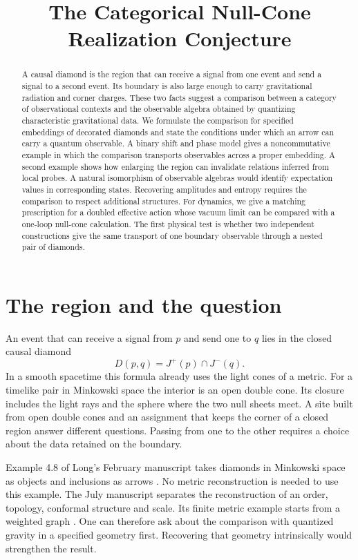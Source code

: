 \documentclass[11pt,letterpaper]{article}
\title{The Categorical Null-Cone Realization Conjecture\series{Synthesis}}
\begin{document}
\ifdefined\HCode\else{}\fi
\maketitle
\begin{abstract}
A causal diamond is the region that can receive a signal from one event and send a signal to a second event. Its boundary is also large enough to carry gravitational radiation and corner charges. These two facts suggest a comparison between a category of observational contexts and the observable algebra obtained by quantizing characteristic gravitational data. We formulate the comparison for specified embeddings of decorated diamonds and state the conditions under which an arrow can carry a quantum observable. A binary shift and phase model gives a noncommutative example in which the comparison transports observables across a proper embedding. A second example shows how enlarging the region can invalidate relations inferred from local probes. A natural isomorphism of observable algebras would identify expectation values in corresponding states. Recovering amplitudes and entropy requires the comparison to respect additional structures. For dynamics, we give a matching prescription for a doubled effective action whose vacuum limit can be compared with a one-loop null-cone calculation. The first physical test is whether two independent constructions give the same transport of one boundary observable through a nested pair of diamonds.
\end{abstract}

\section{The region and the question}
An event that can receive a signal from $p$ and send one to $q$ lies in the closed causal diamond
\[
 D(p,q)=J^+(p)\cap J^-(q).
\]
In a smooth spacetime this formula already uses the light cones of a metric. For a timelike pair in Minkowski space the interior is an open double cone. Its closure includes the light rays and the sphere where the two null sheets meet. A site built from open double cones and an assignment that keeps the corner of a closed region answer different questions. Passing from one to the other requires a choice about the data retained on the boundary.

Example 4.8 of Long's February manuscript takes diamonds in Minkowski space as objects and inclusions as arrows \cite{long}. No metric reconstruction is needed to use this example. The July manuscript separates the reconstruction of an order, topology, conformal structure and scale. Its finite metric example starts from a weighted graph \cite{cond}. One can therefore ask about the comparison with quantized gravity in a specified geometry first. Recovering that geometry intrinsically would strengthen the result.
\end{document}
